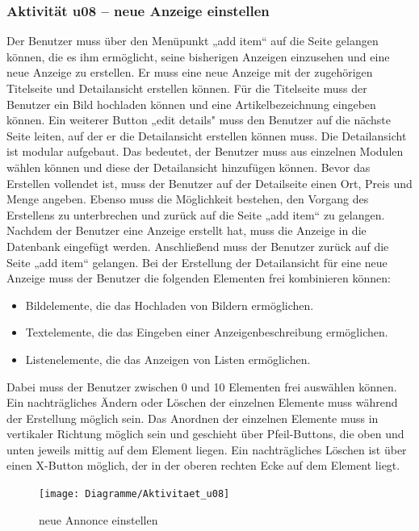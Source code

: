 \documentclass[a4paper,12pt,oneside]{scrartcl}
\begin{document}
\hypertarget{u08}{\subsubsection{Aktivität u08 – neue Anzeige einstellen}}
Der Benutzer muss über den Menüpunkt „add item“ auf die Seite gelangen können, die es ihm ermöglicht, seine bisherigen Anzeigen einzusehen und eine neue Anzeige zu erstellen. 
Er muss eine neue Anzeige mit der zugehörigen Titelseite und Detailansicht erstellen können.
Für die Titelseite muss der Benutzer ein Bild hochladen können und eine Artikelbezeichnung eingeben können. 
Ein weiterer Button „edit details"  muss den Benutzer auf die nächste Seite leiten, auf der er die Detailansicht erstellen können muss. 
Die Detailansicht ist modular aufgebaut. Das bedeutet, der Benutzer muss aus einzelnen Modulen wählen können und diese der Detailansicht hinzufügen können.
Bevor das Erstellen vollendet ist, muss der Benutzer auf der Detailseite einen Ort, Preis und Menge angeben.
Ebenso muss die Möglichkeit bestehen, den Vorgang des Erstellens zu unterbrechen und zurück auf die Seite „add item“ zu gelangen.
Nachdem der Benutzer eine Anzeige erstellt hat, muss die Anzeige in die Datenbank eingefügt werden.
Anschließend muss der Benutzer zurück auf die Seite „add item“ gelangen. 
Bei der Erstellung der Detailansicht für eine neue Anzeige muss der Benutzer die folgenden Elementen frei kombinieren können:

\begin{itemize}
	\item Bildelemente, die das Hochladen von Bildern ermöglichen.
	\item Textelemente, die das Eingeben einer Anzeigenbeschreibung ermöglichen.
	\item Listenelemente, die das Anzeigen von Listen ermöglichen.
\end{itemize}
Dabei muss der Benutzer zwischen 0 und 10 Elementen frei auswählen können.
Ein nachträgliches Ändern oder Löschen der einzelnen Elemente muss während der Erstellung möglich sein.
Das Anordnen der einzelnen Elemente muss in vertikaler Richtung möglich sein und geschieht über Pfeil-Buttons, die oben und unten jeweils mittig auf dem Element liegen.
Ein nachträgliches Löschen ist über einen X-Button möglich, der in der oberen rechten Ecke auf dem Element liegt.

\begin{figure}[!htbp]
\centering
\noindent\texttt{[image: Diagramme/Aktivitaet\_u08]}
\caption{neue Annonce einstellen}
\end{figure}
\FloatBarrier
\end{document}
